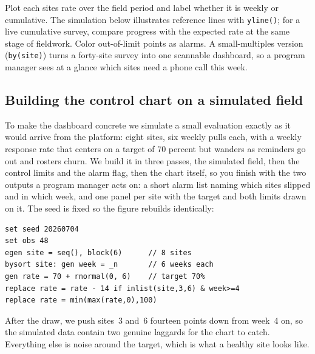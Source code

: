 \documentclass[
    a4paper,
    fontsize=10pt,
    twoside=true,
    numbers=noenddot,
]{kaobook}
\newenvironment{vizcallout}[1][Visualization to build]{%
    \begin{vizbox}[frametitle={#1}]%
}{%
    \end{vizbox}%
}
\begin{document}
\begin{vizcallout}[Visualization to build: the response-rate control chart]
Plot each site\textquotesingle s rate over the field period and label whether it is weekly or cumulative. The simulation below illustrates reference lines with \texttt{yline()}; for a live cumulative survey, compare progress with the expected rate at the same stage of fieldwork. Color out-of-limit points as alarms. A small-multiples version (\texttt{by(site)}) turns a forty-site survey into one scannable dashboard, so a program manager sees at a glance which sites need a phone call this week.
\end{vizcallout}

\subsection{Building the control chart on a simulated field}\label{sec:monitor-build}
To make the dashboard concrete we simulate a small evaluation exactly as it would arrive from the platform: eight sites, six weekly pulls each, with a weekly response rate that centers on a target of 70 percent but wanders as reminders go out and rosters churn. We build it in three passes, the simulated field, then the control limits and the alarm flag, then the chart itself, so you finish with the two outputs a program manager acts on: a short alarm list naming which sites slipped and in which week, and one panel per site with the target and both limits drawn on it. The seed is fixed so the figure rebuilds identically:
\par
{\footnotesize
\begin{verbatim}
set seed 20260704
set obs 48
egen site = seq(), block(6)      // 8 sites
bysort site: gen week = _n       // 6 weeks each
gen rate = 70 + rnormal(0, 6)    // target 70%
replace rate = rate - 14 if inlist(site,3,6) & week>=4
replace rate = min(max(rate,0),100)
\end{verbatim}
}
After the draw, we push sites~3 and~6 fourteen points down from week~4 on, so the simulated data contain two genuine laggards for the chart to catch. Everything else is noise around the target, which is what a healthy site looks like.
\end{document}
